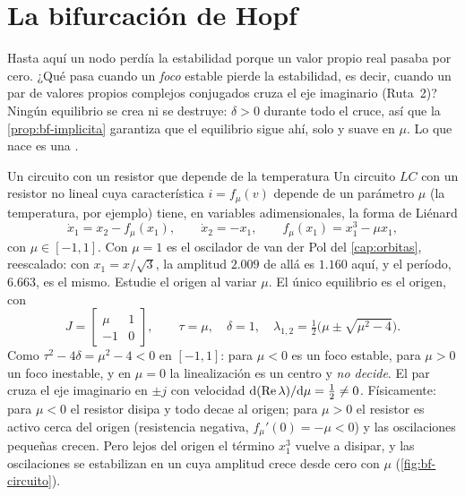 \section{La bifurcación de Hopf}
\label{sec:bf-hopf}

Hasta aquí un nodo perdía la estabilidad porque un valor propio real pasaba por cero. ¿Qué pasa cuando un \emph{foco} estable pierde la estabilidad, es decir, cuando un par de valores propios complejos conjugados cruza el eje imaginario (Ruta~2)? Ningún equilibrio se crea ni se destruye: $\delta>0$ durante todo el cruce, así que la \cref{prop:bf-implicita} garantiza que el equilibrio sigue ahí, solo y suave en $\mu$. Lo que nace es una .

\begin{ejemplo}[label=ej:bf-circuito]{Un circuito con un resistor que depende de la temperatura}
Un circuito $LC$ con un resistor no lineal cuya característica $i=f_\mu(v)$ depende de un parámetro $\mu$ (la temperatura, por ejemplo) tiene, en variables adimensionales, la forma de Liénard
\begin{equation}
  \dot x_1=x_2-f_\mu(x_1),\qquad \dot x_2=-x_1,\qquad f_\mu(x_1)=x_1^3-\mu x_1 ,
  \label{eq:bf-circuito}
\end{equation}
con $\mu\in[-1,1]$. Con $\mu=1$ es el oscilador de van der Pol del \cref{cap:orbitas}, reescalado: con $x_1=x/\sqrt3$, la amplitud $2.009$ de allá es $1.160$ aquí, y el período, $6.663$, es el mismo. Estudie el origen al variar $\mu$.
\solucion El único equilibrio es el origen, con
\[
  J=\begin{bmatrix}\mu&1\\-1&0\end{bmatrix},\qquad \tau=\mu,\quad \delta=1,\quad \lambda_{1,2}=\tfrac12\bigl(\mu\pm\sqrt{\mu^2-4}\bigr) .
\]
Como $\tau^2-4\delta=\mu^2-4<0$ en $[-1,1]$: para $\mu<0$ es un foco estable, para $\mu>0$ un foco inestable, y en $\mu=0$ la linealización es un centro y \emph{no decide}. El par cruza el eje imaginario en $\pm j$ con velocidad $\mathrm{d}(\operatorname{Re}\lambda)/\mathrm{d}\mu=\tfrac12\neq0$. Físicamente: para $\mu<0$ el resistor disipa y todo decae al origen; para $\mu>0$ el resistor es activo cerca del origen (resistencia negativa, $f_\mu'(0)=-\mu<0$) y las oscilaciones pequeñas crecen. Pero lejos del origen el término $x_1^3$ vuelve a disipar, y las oscilaciones se estabilizan en un  cuya amplitud crece desde cero con $\mu$ (\cref{fig:bf-circuito}).
\end{ejemplo}

